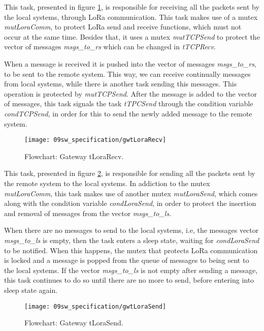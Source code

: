 
This task, presented in figure \ref{fig:gwtLoraRecv}, is responsible for receiving all the packets sent by the local systems, through LoRa communication. This task makes use of a mutex \textit{mutLoraComm}, to protect LoRa send and receive functions, which must not occur at the same time. Besides that, it uses a mutex \textit{mutTCPSend} to protect the vector of messages \textit{msgs\_to\_rs} which can be changed in \textit{tTCPRecv}.

When a message is received it is pushed into the vector of messages \textit{msgs\_to\_rs}, to be sent to the remote system. This way, we can receive continually messages from local systems, while there is another task sending this messages. This operation is protected by \textit{mutTCPSend}. After the message is added to the vector of messages, this task signals the task \textit{tTPCSend} through the condition variable \textit{condTCPSend}, in order for this to send the newly added message to the remote system.

\begin{figure}[H]
	\centering
	\texttt{[image: 09sw\_specification/gwtLoraRecv]}
	\caption{Flowchart: Gateway tLoraRecv.}
	\label{fig:gwtLoraRecv}
\end{figure}


This task, presented in figure \ref{fig:gwtLoraSend}, is responsible for sending all the packets sent by the remote system to the local systems. In addiction to the mutex \textit{mutLoraComm}, this task makes use of another mutex \textit{mutLoraSend}, which comes along with the condition variable \textit{condLoraSend}, in order to protect the insertion and removal of messages from the vector \textit{msgs\_to\_ls}.

When there are no messages to send to the local systems, i.e, the messages vector \textit{msgs\_to\_ls} is empty, then the task enters a sleep state, waiting for \textit{condLoraSend} to be notified. When this happens, the mutex that protects LoRa communication is locked and a message is popped from the queue of messages to being sent to the local systems. If the vector \textit{msgs\_to\_ls} is not empty after sending a message, this task continues to do so until there are no more to send, before entering into sleep state again.

\begin{figure}[H]
	\centering
		\texttt{[image: 09sw\_specification/gwtLoraSend]}
	\caption{Flowchart: Gateway tLoraSend.}
	\label{fig:gwtLoraSend}
\end{figure}

